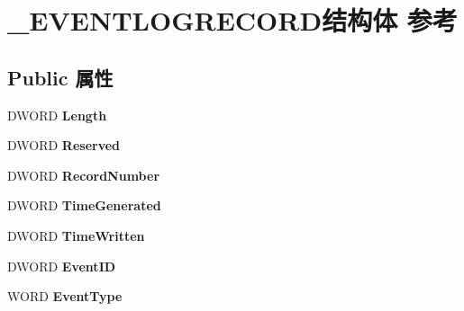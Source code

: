 \hypertarget{struct___e_v_e_n_t_l_o_g_r_e_c_o_r_d}{}\section{\+\_\+\+E\+V\+E\+N\+T\+L\+O\+G\+R\+E\+C\+O\+R\+D结构体 参考}
\label{struct___e_v_e_n_t_l_o_g_r_e_c_o_r_d}
\subsection*{Public 属性}
\begin{DoxyCompactItemize}
\item 
\mbox{\label{struct___e_v_e_n_t_l_o_g_r_e_c_o_r_d_ad3999020165dd992e4823e9375373643}} 
D\+W\+O\+RD {\bfseries Length}
\item 
\mbox{\label{struct___e_v_e_n_t_l_o_g_r_e_c_o_r_d_a446affd4ed2339e430bedaae99d4d99e}} 
D\+W\+O\+RD {\bfseries Reserved}
\item 
\mbox{\label{struct___e_v_e_n_t_l_o_g_r_e_c_o_r_d_a8d805dfb07933b921b9db88a164ecaba}} 
D\+W\+O\+RD {\bfseries Record\+Number}
\item 
\mbox{\label{struct___e_v_e_n_t_l_o_g_r_e_c_o_r_d_a3c72836a20e08a5e6c137e9240ac1d3e}} 
D\+W\+O\+RD {\bfseries Time\+Generated}
\item 
\mbox{\label{struct___e_v_e_n_t_l_o_g_r_e_c_o_r_d_a535150c792ddddda997506f920e2b16d}} 
D\+W\+O\+RD {\bfseries Time\+Written}
\item 
\mbox{\label{struct___e_v_e_n_t_l_o_g_r_e_c_o_r_d_a6b47927a621616958a25a8a33fb84824}} 
D\+W\+O\+RD {\bfseries Event\+ID}
\item 
\mbox{\label{struct___e_v_e_n_t_l_o_g_r_e_c_o_r_d_a1ea0fbb90aaf88f1f4cb5f882a9bb21e}} 
W\+O\+RD {\bfseries Event\+Type}
\item 
\mbox{\label{struct___e_v_e_n_t_l_o_g_r_e_c_o_r_d_a117fc67312cfafb9205f130e453c4b56}} 

\end{DoxyCompactItemize}
